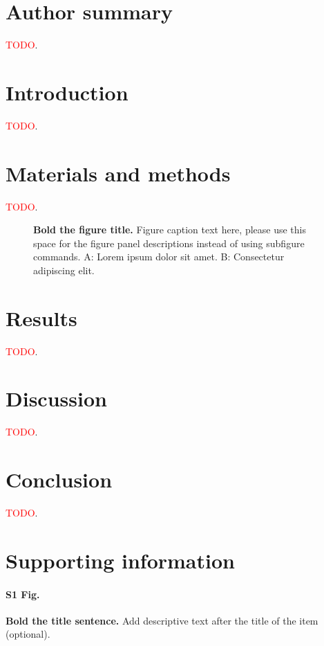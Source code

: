 \documentclass[10pt,letterpaper]{article}
\begin{document}
\section*{Author summary}
\textcolor{red}{TODO}. 

\linenumbers

\section*{Introduction}
\textcolor{red}{TODO}. 

\section*{Materials and methods}
\textcolor{red}{TODO}. 

\begin{figure}[!h]
\caption{{\bf Bold the figure title.}
Figure caption text here, please use this space for the figure panel descriptions instead of using subfigure commands. A: Lorem ipsum dolor sit amet. B: Consectetur adipiscing elit.}
\label{fig1}
\end{figure}

\section*{Results}
\textcolor{red}{TODO}. 


\section*{Discussion}
\textcolor{red}{TODO}. 

\section*{Conclusion}
\textcolor{red}{TODO}. 

\section*{Supporting information}

\paragraph*{S1 Fig.}
\label{S1_Fig}
{\bf Bold the title sentence.} Add descriptive text after the title of the item (optional).
\end{document}
